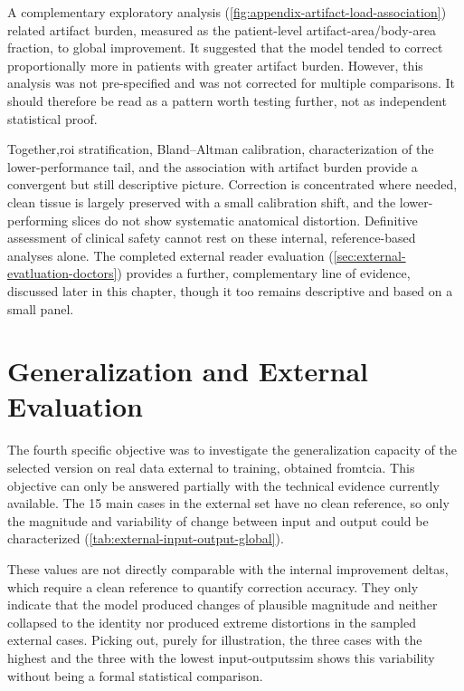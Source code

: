 A complementary exploratory analysis (\autoref{fig:appendix-artifact-load-association}) related artifact burden, measured as the patient-level artifact-area/body-area fraction, to global improvement. It suggested that the model tended to correct proportionally more in patients with greater artifact burden. However, this analysis was not pre-specified and was not corrected for multiple comparisons. It should therefore be read as a pattern worth testing further, not as independent statistical proof.

Together,\acrshort{roi} stratification, Bland--Altman calibration, characterization of the lower-performance tail, and the association with artifact burden provide a convergent but still descriptive picture. Correction is concentrated where needed, clean tissue is largely preserved with a small calibration shift, and the lower-performing slices do not show systematic anatomical distortion. Definitive assessment of clinical safety cannot rest on these internal, reference-based analyses alone. The completed external reader evaluation (\autoref{sec:external-evatluation-doctors}) provides a further, complementary line of evidence, discussed later in this chapter, though it too remains descriptive and based on a small panel.

\section{Generalization and External Evaluation}

The fourth specific objective was to investigate the generalization capacity of the selected version on real data external to training, obtained from\acrshort{tcia}. This objective can only be answered partially with the technical evidence currently available. The 15 main cases in the external set have no clean reference, so only the magnitude and variability of change between input and output could be characterized (\autoref{tab:external-input-output-global}).

These values are not directly comparable with the internal improvement deltas, which require a clean reference to quantify correction accuracy. They only indicate that the model produced changes of plausible magnitude and neither collapsed to the identity nor produced extreme distortions in the sampled external cases. Picking out, purely for illustration, the three cases with the highest and the three with the lowest input-output\acrshort{ssim} shows this variability without being a formal statistical comparison.

